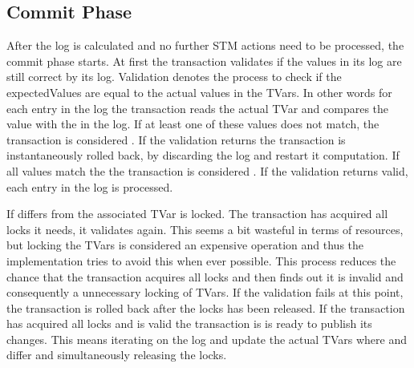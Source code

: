 \subsection{Commit Phase}
\label{Sec:STMImpl}
After the log is calculated and no further STM actions need to be processed, the commit phase starts.
At first the transaction validates if the values in its log are still correct by  its log.
Validation denotes the process to check if the expectedValues are equal to the actual values in the TVars.
In other words for each entry in the log the transaction reads the actual TVar and compares the value with 
the  in the log. If at least one of these values does not match, the transaction is considered
. If the validation returns the transaction is instantaneously rolled back, by discarding the log 
and restart it computation. If all values match the the transaction is considered . If the validation
returns valid, each entry in the log is processed. 

If  differs from  the associated TVar is locked. The transaction has acquired all 
locks it needs, it validates again. This seems a bit wasteful in terms of resources, but locking the TVars is considered
an expensive operation and thus the implementation tries to avoid this when ever possible. This process reduces the chance
that the transaction acquires all locks and then finds out it is invalid and consequently a unnecessary locking of TVars.
If the validation fails at this point, the transaction is rolled back after the locks has been released.
If the transaction has acquired all locks and is valid the transaction is is ready to publish its changes.
This means iterating on the log and update the actual TVars where  and  differ and
simultaneously releasing the locks. 

